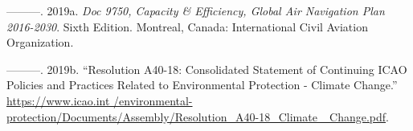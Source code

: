 \documentclass[
  a4paper,
  DIV=11,
  numbers=noendperiod]{scrreprt}
\newlength{\cslhangindent}
\newlength{\cslentryspacingunit} %
\newenvironment{CSLReferences}[2] %
 {%
  \setlength{\parindent}{0pt}
  \ifodd #1
  \let\oldpar\par
  \def\par{\hangindent=\cslhangindent\oldpar}
  \fi
  \setlength{\parskip}{#2\cslentryspacingunit}
 }%
 {}
\begin{document}
\begin{CSLReferences}{1}{0}
\leavevmode{}%
---------. 2019a. \emph{Doc 9750, Capacity \& Efficiency, Global Air
Navigation Plan 2016-2030}. Sixth Edition. Montreal, Canada:
International Civil Aviation Organization.

\leavevmode{}%
---------. 2019b. {``Resolution A40-18: Consolidated Statement of
Continuing ICAO Policies and Practices Related to Environmental
Protection - Climate Change.''}
\href{https://www.icao.int\%20/environmental-protection/Documents/Assembly/Resolution_A40-18_Climate\%20_Change.pdf}{https://www.icao.int
/environmental-protection/Documents/Assembly/Resolution\_A40-18\_Climate
\_Change.pdf}.

\end{CSLReferences}
\end{document}
